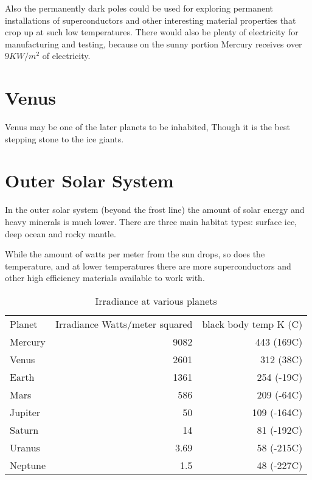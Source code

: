 Also the permanently dark poles could be used for exploring permanent
installations of superconductors and other interesting material properties that
crop up at such low temperatures.  There would also be plenty of electricity for
manufacturing and testing, because on the sunny portion Mercury receives over
$9KW/m^2$ of electricity. 


\section{Venus}

Venus may be one of the later planets to be inhabited, 
Though it is the best stepping stone to the ice giants.

\section{Outer Solar System}

In the outer solar system (beyond the frost line) the amount of solar energy 
and heavy minerals is much lower. There are three main habitat types: surface
ice, deep ocean and rocky mantle. 

While the amount of watts per meter from the sun drops, so does the temperature,
and at lower temperatures there are more superconductors and other high
efficiency materials available to work with.

\begin{table}
  \caption{Irradiance at various planets}
  \begin{tabular}{lrr}
    Planet & Irradiance Watts/meter squared & black body temp K (C) \\
    Mercury & 9082\cite{nasaMercury} & 443 (169C)\cite{bbtemp}\\
    Venus & 2601\cite{nasaVenus} & 312\cite{bbtemp} (38C) \\
    Earth & 1361\cite{nasaEarth} & 254\cite{nasaEarth} (-19C) \\
    Mars & 586\cite{nasaMars} & 209\cite{nasaMars} (-64C) \\
    Jupiter & 50\cite{nasaJupiter} & 109\cite{nasaJupiter} (-164C) \\
    Saturn & 14\cite{nasaSaturn} & 81\cite{nasaJupiter} (-192C)\\ 
    Uranus & 3.69\cite{nasaUranus} & 58\cite{nasaUranus} (-215C)\\
    Neptune & 1.5\cite{nasaNeptune} & 48\cite{bbtemp} (-227C) \\
\end{tabular}
\end{table}

